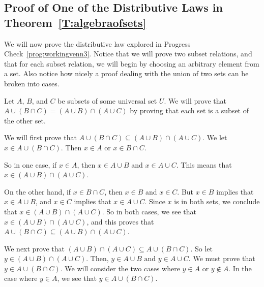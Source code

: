 \subsection*{Proof of One of the Distributive Laws in Theorem~\ref{T:algebraofsets}}
We will now prove the distributive law explored in Progress Check~\ref{prog:workingvenn3}.  Notice that we will prove two subset relations, and that for each subset relation, we will begin by choosing an arbitrary element from a set.  Also notice how nicely a proof dealing with the union of two sets can be broken into cases.
\noindent

\setcounter{equation}{0}
\begin{myproof}
Let  $A$, $B$, and  $C$  be subsets of some universal set  $U$.  We will prove that  $A \cup \left( {B \cap C} \right) = \left( {A \cup B} \right) \cap \left( {A \cup C} \right)$ by proving that each set is a subset of the other set.

We will first prove that  $A \cup \left( {B \cap C} \right) \subseteq \left( {A \cup B} \right) \cap \left( {A \cup C} \right)$.  We let \linebreak  
$x \in A \cup \left( {B \cap C} \right)$.  Then  $x \in A\text{  or  }x \in B \cap C$.

So in one case, if  $x \in A$, then  $x \in A \cup B$  and  $x \in A \cup C$.  This means that  $x \in \left( {A \cup B} \right) \cap \left( {A \cup C} \right)$.

On the other hand, if  $x \in B \cap C$, then  $x \in B$ and $x \in C$.  But  $x \in B$ implies that  $x \in A \cup B$, and  $x \in C$ implies that  $x \in A \cup C$.  Since $x$ is in both sets, we conclude that $x \in \left( {A \cup B} \right) \cap \left( {A \cup C} \right)$.  So in both cases, we see that $x \in \left( {A \cup B} \right) \cap \left( {A \cup C} \right)$, and this proves that $A \cup \left( {B \cap C} \right) \subseteq \left( {A \cup B} \right) \cap \left( {A \cup C} \right)$.

\vskip6pt
We next prove that  $\left( {A \cup B} \right) \cap \left( {A \cup C} \right) \subseteq A \cup \left( {B \cap C} \right)$.  So let \linebreak
$y \in \left( {A \cup B} \right) \cap \left( {A \cup C} \right)$.  Then,  $y \in A \cup B\text{  and  }y \in A \cup C$. We must prove that $y \in A \cup \left( {B \cap C} \right)$.  We will consider the two cases where $y \in A$ or $y \notin A$.
In the case where $y \in A$, we see that $y \in A \cup \left( {B \cap C} \right)$.


\end{myproof}
